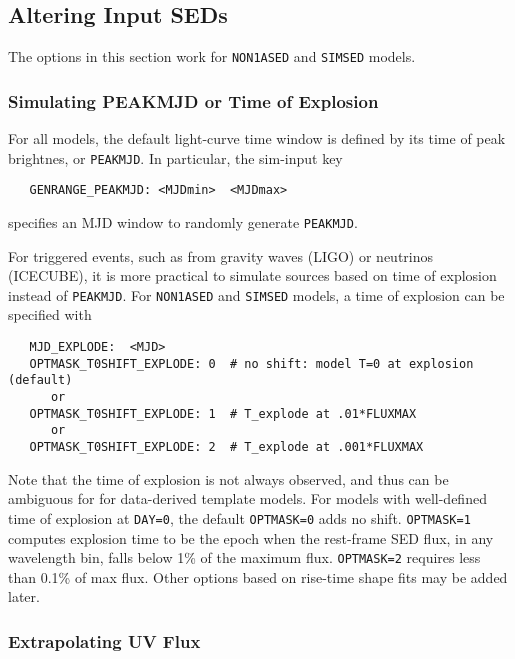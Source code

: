 \documentclass[12pt]{article}
\begin{document}
\clearpage
\subsection{Altering Input SEDs}
\label{subsec:Alter_SED}

The options in this section work for 
{\tt NON1ASED} and {\tt SIMSED} models.

\subsubsection{Simulating PEAKMJD or Time of Explosion}
\label{sss:tpeak_or_texplode}


For all models, the default light-curve time window is
defined by its time of peak brightnes, or {\tt PEAKMJD}.
In particular, the sim-input key 
\begin{verbatim}
   GENRANGE_PEAKMJD: <MJDmin>  <MJDmax>
\end{verbatim}
specifies an MJD window to randomly generate {\tt PEAKMJD}.

For triggered events, 
such as from gravity waves (LIGO) or neutrinos (ICECUBE),
it is more practical to simulate sources based on time
of explosion instead of {\tt PEAKMJD}. 
For {\tt NON1ASED} and {\tt SIMSED} models,
a time of explosion can be specified with
\begin{verbatim}
   MJD_EXPLODE:  <MJD>
   OPTMASK_T0SHIFT_EXPLODE: 0  # no shift: model T=0 at explosion (default)
      or
   OPTMASK_T0SHIFT_EXPLODE: 1  # T_explode at .01*FLUXMAX 
      or
   OPTMASK_T0SHIFT_EXPLODE: 2  # T_explode at .001*FLUXMAX
\end{verbatim}
%
Note that the time of explosion is not always observed, 
and thus can be ambiguous for for data-derived template models. 
For models with well-defined time of explosion at {\tt DAY=0},
the default {\tt OPTMASK=0} adds no shift.
{\tt OPTMASK=1} computes explosion time to be the epoch when 
the rest-frame SED flux, in any wavelength bin,  
falls below 1\% of the maximum flux.
{\tt OPTMASK=2} requires less than 0.1\% of max flux.
Other options based on rise-time shape fits may be added later.

\subsubsection{Extrapolating UV Flux}
\label{sss:UVLAM_EXTRAP}
\end{document}
